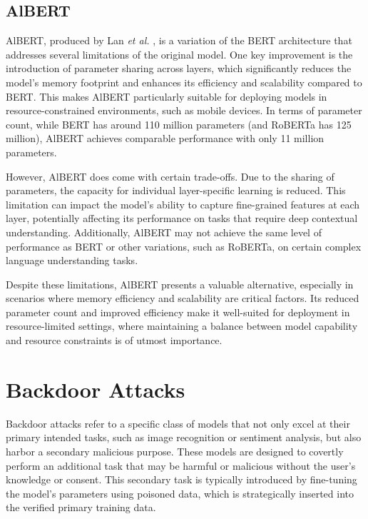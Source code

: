 \subsection{AlBERT}

AlBERT, produced by Lan \textit{et al.} \cite{AlBERT}, is a variation of the BERT architecture that addresses several limitations of the original model. One key improvement is the introduction of parameter sharing across layers, which significantly reduces the model's memory footprint and enhances its efficiency and scalability compared to BERT. This makes AlBERT particularly suitable for deploying models in resource-constrained environments, such as mobile devices. In terms of parameter count, while BERT has around 110 million parameters (and RoBERTa has 125 million), AlBERT achieves comparable performance with only 11 million parameters.

However, AlBERT does come with certain trade-offs. Due to the sharing of parameters, the capacity for individual layer-specific learning is reduced. This limitation can impact the model's ability to capture fine-grained features at each layer, potentially affecting its performance on tasks that require deep contextual understanding. Additionally, AlBERT may not achieve the same level of performance as BERT or other variations, such as RoBERTa, on certain complex language understanding tasks.

Despite these limitations, AlBERT presents a valuable alternative, especially in scenarios where memory efficiency and scalability are critical factors. Its reduced parameter count and improved efficiency make it well-suited for deployment in resource-limited settings, where maintaining a balance between model capability and resource constraints is of utmost importance.

\section{Backdoor Attacks}

Backdoor attacks refer to a specific class of models that not only excel at their primary intended tasks, such as image recognition or sentiment analysis, but also harbor a secondary malicious purpose. These models are designed to covertly perform an additional task that may be harmful or malicious without the user's knowledge or consent. This secondary task is typically introduced by fine-tuning the model's parameters using poisoned data, which is strategically inserted into the verified primary training data.

